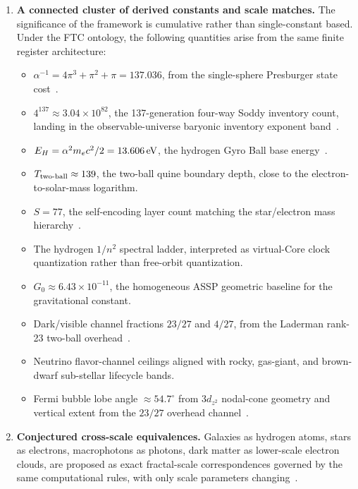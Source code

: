 \documentclass[11pt,a4paper]{article}
\begin{document}
\begin{enumerate}
  \item \textbf{A connected cluster of derived constants and scale matches.}
  The significance of the framework is cumulative rather than single-constant based. Under the FTC ontology, the following quantities arise from the same finite register architecture:
    \begin{itemize}
      \item \(\alpha^{-1}=4\pi^3+\pi^2+\pi=137.036\), from the single-sphere Presburger state cost~\cite{Presburger1929,Soddy1936}.
      \item \(4^{137}\approx3.04\times10^{82}\), the 137-generation four-way Soddy inventory count, landing in the observable-universe baryonic inventory exponent band~\cite{Planck2018VI,Page2016,Macquart2020}.
      \item \(E_H=\alpha^2m_ec^2/2=13.606\,{\rm eV}\), the hydrogen
      Gyro Ball base energy~\cite{Bohr1913,Rydberg1890,CODATA2022}.
      \item \(T_{\rm two\text{-}ball}\approx139\), the two-ball quine boundary depth, close to the electron-to-solar-mass logarithm.
      \item \(S=77\), the self-encoding layer count matching the
      star/electron mass hierarchy~\cite{CODATA2022}.
      \item The hydrogen \(1/n^2\) spectral ladder, interpreted as virtual-Core clock quantization rather than free-orbit quantization.
      \item \(G_0\approx6.43\times10^{-11}\), the homogeneous ASSP geometric baseline for the gravitational constant.
      \item Dark/visible channel fractions \(23/27\) and \(4/27\), from the Laderman rank-23 two-ball overhead~\cite{Laderman1976}.
      \item Neutrino flavor-channel ceilings aligned with rocky, gas-giant, and brown-dwarf sub-stellar lifecycle bands.
      \item Fermi bubble lobe angle \(\approx54.7^\circ\) from \(3d_{z^2}\) nodal-cone geometry and vertical extent from the \(23/27\) overhead channel~\cite{Su2010,Dobler2010,Ackermann2014,Sarkar2015}.
    \end{itemize}

  \item \textbf{Conjectured cross-scale equivalences.}
  Galaxies as hydrogen atoms, stars as electrons, macrophotons as photons, dark matter as lower-scale electron clouds, are proposed as exact fractal-scale correspondences governed by the same computational rules, with only scale parameters changing~\cite{FSEquivalence2026}.


\end{enumerate}
\end{document}
